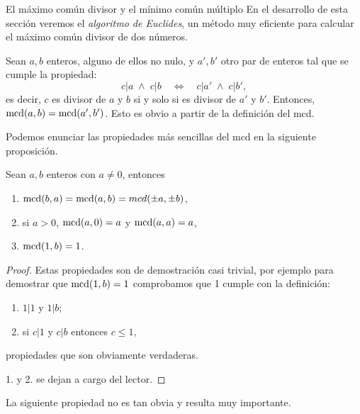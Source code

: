 \begin{section}{El máximo común divisor y el mínimo común múltiplo}
En  el desarrollo de esta sección veremos el \textit{algoritmo de Euclides}, un método muy eficiente para calcular el máximo común divisor de dos números. 


\begin{observacion}\label{obs-mcd-divisores} Sean $a,b$ enteros,  alguno de ellos  no nulo, y $a', b'$ otro par de enteros tal que se cumple la propiedad:
    $$
    c |a \; \wedge\;  c| b \quad \Leftrightarrow \quad  c |a' \; \wedge\;  c| b', 
    $$
    es decir, $c$  es divisor de $a$ y $b$ si y solo si es divisor de $a'$ y $b'$. Entonces,  $\operatorname{mcd}(a,b) = \operatorname{mcd}(a',b')$. Esto es obvio a partir de la definición del mcd.
    
\end{observacion}

Podemos enunciar las propiedades más sencillas del mcd en la siguiente proposición.

\begin{proposicion} Sean $a,b$ enteros con $a \not = 0$, entonces
    \begin{enumerate}
        \item $\operatorname{mcd}(b,a) = \operatorname{mcd}(a,b) = mcd(\pm a, \pm b)$,
        \item si $a>0$,  $\operatorname{mcd}(a,0) = a$ y $\operatorname{mcd}(a,a) = a$,
        \item $\operatorname{mcd}(1,b) = 1$.
    \end{enumerate}
\end{proposicion}
\begin{proof}
    Estas propiedades son de demostración casi trivial, por ejemplo para demostrar que  $\operatorname{mcd}(1,b) = 1$ comprobamos que 1 cumple con la definición:
    \begin{enumerate}[label=\textit{\alph*)}]
        \item $ 1|1$ y $1|b$;
        \item si $ c|1 $ y $c|b$ entonces $ c \le 1$,
    \end{enumerate}
    propiedades que son obviamente verdaderas.
    
    1. y 2.  se dejan a cargo del lector. 
\end{proof}

La siguiente propiedad no es tan obvia y resulta muy importante. 


\end{section}
